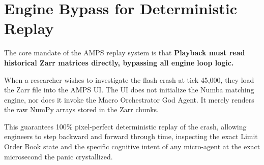 \section{Engine Bypass for Deterministic Replay}

The core mandate of the AMPS replay system is that \textbf{Playback must read historical Zarr matrices directly, bypassing all engine loop logic.}

When a researcher wishes to investigate the flash crash at tick 45,000, they load the Zarr file into the AMPS UI. The UI does not initialize the Numba matching engine, nor does it invoke the Macro Orchestrator God Agent. It merely renders the raw NumPy arrays stored in the Zarr chunks. 

This guarantees 100\% pixel-perfect deterministic replay of the crash, allowing engineers to step backward and forward through time, inspecting the exact Limit Order Book state and the specific cognitive intent of any micro-agent at the exact microsecond the panic crystallized.
